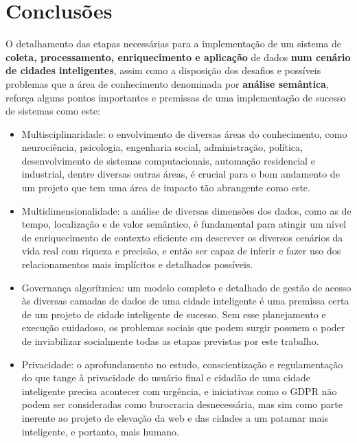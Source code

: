 \chapter{Conclusões}

O detalhamento das etapas necessárias para a implementação de um sistema de \textbf{coleta, processamento, enriquecimento e aplicação} de dados \textbf{num cenário de cidades inteligentes}, assim como a disposição dos desafios e possíveis problemas que a área de conhecimento denominada por \textbf{análise semântica}, reforça alguns pontos importantes e premissas de uma implementação de sucesso de sistemas como este:

\begin{itemize}
    \item Multisciplinaridade: o envolvimento de diversas áreas do conhecimento, como neurociência, psicologia, engenharia social, administração, política, desenvolvimento de sistemas computacionais, automação residencial e industrial, dentre diversas outras áreas, é crucial para o bom andamento de um projeto que tem uma área de impacto tão abrangente como este.
    \item Multidimensionalidade: a análise de diversas dimensões dos dados, como as de tempo, localização e de valor semântico, é fundamental para atingir um nível de enriquecimento de contexto eficiente em descrever os diversos cenários da vida real com riqueza e precisão, e então ser capaz de inferir e fazer uso dos relacionamentos mais implícitos e detalhados possíveis.
    \item Governança algorítmica: um modelo completo e detalhado de gestão de acesso às diversas camadas de dados de uma cidade inteligente é uma premissa certa de um projeto de cidade inteligente de sucesso. Sem esse planejamento e execução cuidadoso, os problemas sociais que podem surgir possuem o poder de inviabilizar socialmente todas as etapas previstas por este trabalho.
    \item Privacidade: o aprofundamento no estudo, conscientização e regulamentação do que tange à privacidade do usuário final e cidadão de uma cidade inteligente precisa acontecer com urgência, e iniciativas como o GDPR não podem ser consideradas como burocracia desnecessária, mas sim como parte inerente ao projeto de elevação da web e das cidades a um patamar mais inteligente, e portanto, mais humano.
\end{itemize}